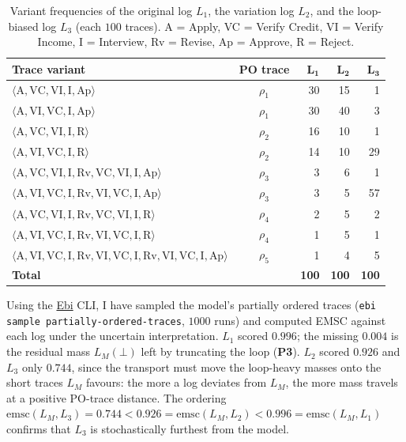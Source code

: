 \begin{table}[h]
\centering
\footnotesize
\setlength{\tabcolsep}{4pt}
\renewcommand{\arraystretch}{1.15}
\begin{tabular}{l c r r r}
\hline
\textbf{Trace variant} & \textbf{PO trace} & $\mathbf{L_1}$ & $\mathbf{L_2}$ & $\mathbf{L_3}$ \\
\hline
$\langle \text{A}, \text{VC}, \text{VI}, \text{I}, \text{Ap}\rangle$ & $\rho_1$ & 30 & 15 & 1 \\
$\langle \text{A}, \text{VI}, \text{VC}, \text{I}, \text{Ap}\rangle$ & $\rho_1$ & 30 & 40 & 3 \\
$\langle \text{A}, \text{VC}, \text{VI}, \text{I}, \text{R}\rangle$ & $\rho_2$ & 16 & 10 & 1 \\
$\langle \text{A}, \text{VI}, \text{VC}, \text{I}, \text{R}\rangle$ & $\rho_2$ & 14 & 10 & 29 \\
$\langle \text{A}, \text{VC}, \text{VI}, \text{I}, \text{Rv}, \text{VC}, \text{VI}, \text{I}, \text{Ap}\rangle$ & $\rho_3$ & 3 & 6 & 1 \\
$\langle \text{A}, \text{VI}, \text{VC}, \text{I}, \text{Rv}, \text{VI}, \text{VC}, \text{I}, \text{Ap}\rangle$ & $\rho_3$ & 3 & 5 & 57 \\
$\langle \text{A}, \text{VC}, \text{VI}, \text{I}, \text{Rv}, \text{VC}, \text{VI}, \text{I}, \text{R}\rangle$ & $\rho_4$ & 2 & 5 & 2 \\
$\langle \text{A}, \text{VI}, \text{VC}, \text{I}, \text{Rv}, \text{VI}, \text{VC}, \text{I}, \text{R}\rangle$ & $\rho_4$ & 1 & 5 & 1 \\
$\langle \text{A}, \text{VI}, \text{VC}, \text{I}, \text{Rv}, \text{VI}, \text{VC}, \text{I}, \text{Rv}, \text{VI}, \text{VC}, \text{I}, \text{Ap}\rangle$ & $\rho_5$ & 1 & 4 & 5 \\
\hline
\textbf{Total} & & \textbf{100} & \textbf{100} & \textbf{100} \\
\hline
\end{tabular}
\caption{Variant frequencies of the original log $L_1$, the variation log $L_2$,
and the loop-biased log $L_3$ (each $100$ traces). A = Apply, VC = Verify Credit,
VI = Verify Income, I = Interview, Rv = Revise, Ap = Approve, R = Reject.}
\label{tab:logs}
\end{table}

Using the \href{https://leemans.ch/ebi/index.php}{Ebi} CLI, I have sampled the model's
partially ordered traces (\texttt{ebi sample partially-ordered-traces}, $1000$
runs) and computed EMSC against each log under the uncertain interpretation. $L_1$ scored $0.996$; the missing
$0.004$ is the residual mass $L_M(\bot)$ left by truncating the loop
(\textbf{P3}). $L_2$ scored $0.926$ and $L_3$ only $0.744$, since the transport
must move the loop-heavy masses onto the short traces $L_M$ favours: the more a
log deviates from $L_M$, the more mass travels at a positive PO-trace distance.
The ordering $\mathrm{emsc}(L_M, L_3) = 0.744 < 0.926 = \mathrm{emsc}(L_M, L_2) <
0.996 = \mathrm{emsc}(L_M, L_1)$ confirms that $L_3$ is stochastically furthest
from the model.